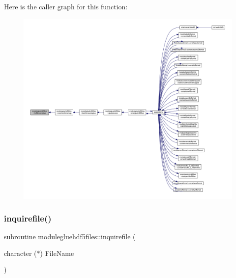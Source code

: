 Here is the caller graph for this function\+:\nopagebreak
\begin{figure}[H]
\begin{center}
\leavevmode
\includegraphics[width=350pt]{namespacemodulegluehdf5files_a9a6c2b8f1c89f66fc3308854f2ab8e57_icgraph}
\end{center}
\end{figure}
\mbox{\label{namespacemodulegluehdf5files_a94366c8fe9f21f17f5e9be7a2738a5c1}} 
\subsubsection{\texorpdfstring{inquirefile()}{inquirefile()}}
{\footnotesize\ttfamily subroutine modulegluehdf5files\+::inquirefile (\begin{DoxyParamCaption}\item[{character ($\ast$)}]{File\+Name }\end{DoxyParamCaption})\hspace{0.3cm}{\ttfamily [private]}}

